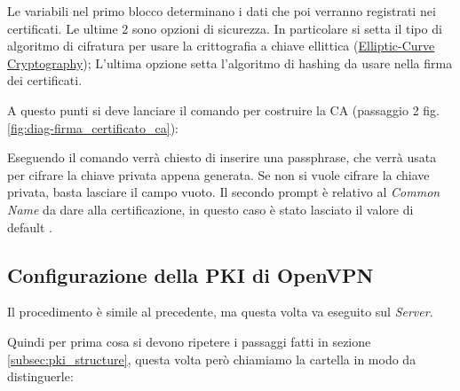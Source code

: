 Le variabili nel primo blocco determinano i dati che poi verranno registrati nei certificati. Le ultime 2 sono opzioni di sicurezza. In particolare si setta il tipo di algoritmo di cifratura per usare la crittografia a chiave ellittica (\href{https://en.wikipedia.org/wiki/Elliptic-curve_cryptography}{Elliptic-Curve Cryptography}); L'ultima opzione setta l'algoritmo di hashing da usare nella firma dei certificati.

A questo punti si deve lanciare il comando  per costruire la CA (passaggio 2 fig.\ref{fig:diag-firma_certificato_ca}):


Eseguendo il comando verrà chiesto di inserire una passphrase, che verrà usata per cifrare la chiave privata appena generata. Se non si vuole cifrare la chiave privata, basta lasciare il campo vuoto. Il secondo prompt è relativo al \textit{Common Name} da dare alla certificazione, in questo caso è stato lasciato il valore di default .

\subsection{Configurazione della PKI di OpenVPN \ok} %
\label{sec:pki_openvpn}

Il procedimento è simile al precedente, ma questa volta va eseguito sul \textit{Server}.

Quindi per prima cosa si devono ripetere i passaggi fatti in sezione \ref{subsec:pki_structure}, questa volta però chiamiamo la cartella  in modo da distinguerle:

